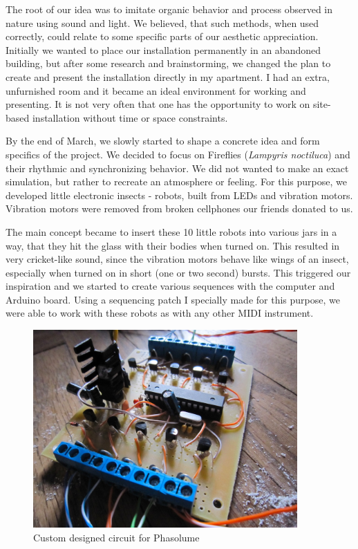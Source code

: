 \documentclass[12pt,a4paper,oneside]{report}
\begin{document}
The root of our idea was to imitate organic behavior and process observed in nature using sound and light.  We believed, that such methods, when used correctly, could relate to some specific parts of our aesthetic appreciation. Initially we wanted to place our installation permanently in an abandoned building, but after some research and brainstorming, we changed the plan to create and present the installation directly in my apartment. I had an extra, unfurnished room and it became an ideal environment for working and presenting.  It is not very often that one has the opportunity to work on site-based installation without time or space constraints.

By the end of March, we slowly started to shape a concrete idea and form specifics of the project. We decided to focus on Fireflies (\emph{Lampyris noctiluca}) and their rhythmic and synchronizing behavior. We did not wanted to make an exact simulation, but rather to recreate an atmosphere or feeling.  For this purpose, we developed little electronic insects - robots, built from LEDs and vibration motors. Vibration motors were removed from broken cellphones our friends donated to us.

The main concept became to insert these 10 little robots into various jars in a way, that they hit the glass with their bodies when turned on. This resulted in very cricket-like sound, since the vibration motors behave like wings of an insect, especially when turned on in short (one or two second) bursts. This triggered our inspiration and we started to create various sequences with the computer and Arduino board. Using a sequencing patch I specially made for this purpose, we were able to work with these robots as with any other MIDI instrument.

\begin{figure}  
  \centering
    \includegraphics[width=0.9\textwidth]{img/phasolume}
	\caption{Custom designed circuit for Phasolume}
	\label{fig:phasolume}
\end{figure}
\end{document}
